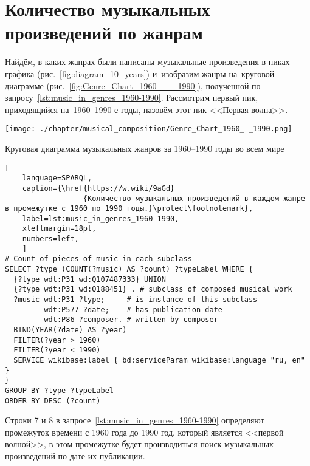 \newpage
\section{Количество музыкальных произведений по жанрам}
\label{chapter:Number-of-musical-works-by-genre}

Найдём, в каких жанрах были написаны музыкальные произведения 
в пиках графика (рис.~\ref{fig:diagram_10_years}) 
и~изобразим жанры на~круговой диаграмме (рис.~\ref{fig:Genre_Chart_1960_—_1990}), 
полученной по запросу~\ref{lst:music_in_genres_1960-1990}. 
Рассмотрим первый пик, приходящийся на~1960--1990-е годы, назовём этот пик <<Первая волна>>.

\begin{marginfigure}[0\baselineskip]
	\texttt{[image: ./chapter/musical\_composition/Genre\_Chart\_1960\_—\_1990.png]}
	\caption{Круговая диаграмма музыкальных жанров за 1960--1990 годы во всем мире}%
	\label{fig:Genre_Chart_1960_—_1990}%
\end{marginfigure}

\begin{lstlisting}[ 
    language=SPARQL,
    caption={\href{https://w.wiki/9aGd}
                  {Количество музыкальных произведений в каждом жанре в промежутке с 1960 по 1990 годы.}\protect\footnotemark},
    label=lst:music_in_genres_1960-1990,
    xleftmargin=18pt,
    numbers=left,
    ]
# Count of pieces of music in each subclass
SELECT ?type (COUNT(?music) AS ?count) ?typeLabel WHERE {
  {?type wdt:P31 wd:Q107487333} UNION 
  {?type wdt:P31 wd:Q188451} . # subclass of composed musical work
  ?music wdt:P31 ?type;     # is instance of this subclass
         wdt:P577 ?date;    # has publication date
         wdt:P86 ?composer. # written by composer
  BIND(YEAR(?date) AS ?year)
  FILTER(?year > 1960)        
  FILTER(?year < 1990)
  SERVICE wikibase:label { bd:serviceParam wikibase:language "ru, en" }
}
GROUP BY ?type ?typeLabel
ORDER BY DESC (?count)
\end{lstlisting}%

Строки 7 и 8 в запросе~\ref{lst:music_in_genres_1960-1990} определяют промежуток времени с 1960 года до 1990 год, который является <<первой волной>>, в этом промежутке будет производиться поиск музыкальных произведений по дате их публикации.


